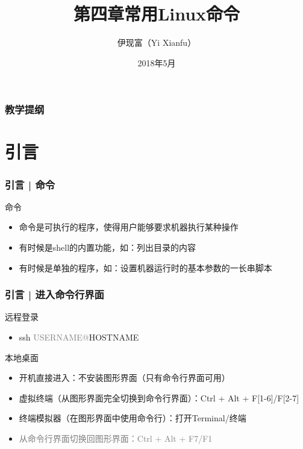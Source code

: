 



\title[常用Linux命令]{第四章\quad 常用Linux命令}
\author[Yixf]{伊现富（Yi Xianfu）}
\date{2018年5月}


\begin{frame}
  \titlepage
\end{frame}

\begin{frame}[plain,label=current]
  \frametitle{教学提纲}
  \setcounter{tocdepth}{3}
  \begin{multicols}{2}
    \tableofcontents
  \end{multicols}
\end{frame}


\section{引言}
\begin{frame}
  \frametitle{引言 | 命令}
  \begin{block}{命令}
    \begin{itemize}
      \item 命令是可执行的程序，使得用户能够要求机器执行某种操作
      \item 有时候是shell的内置功能，如：列出目录的内容
      \item 有时候是单独的程序，如：设置机器运行时的基本参数的一长串脚本
    \end{itemize}
  \end{block}
\end{frame}

\begin{frame}
  \frametitle{引言 | \alert{进入命令行界面}}
  \begin{block}{远程登录}
    \begin{itemize}
      \item ssh \textcolor{gray}{USERNAME@}HOSTNAME
    \end{itemize}
  \end{block}
  \pause
  \begin{block}{本地桌面}
    \begin{itemize}
      \item 开机直接进入：不安装图形界面（只有命令行界面可用）
      \item 虚拟终端（从图形界面完全切换到命令行界面）：Ctrl + Alt + F[1-6]/F[2-7]
      \item 终端模拟器（在图形界面中使用命令行）：打开Terminal/终端
      \item \textcolor{gray}{从命令行界面切换回图形界面：Ctrl + Alt + F7/F1}
    \end{itemize}
  \end{block}
\end{frame}


